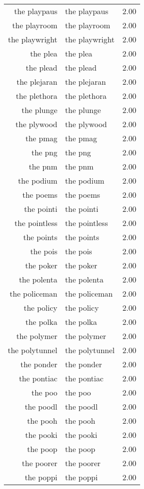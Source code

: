 \begin{table}[ht]
\begin{tabular}{rlr}
  the playpaus & the playpaus & 2.00 \\ 
  the playroom & the playroom & 2.00 \\ 
  the playwright & the playwright & 2.00 \\ 
  the plea & the plea & 2.00 \\ 
  the plead & the plead & 2.00 \\ 
  the plejaran & the plejaran & 2.00 \\ 
  the plethora & the plethora & 2.00 \\ 
  the plunge & the plunge & 2.00 \\ 
  the plywood & the plywood & 2.00 \\ 
  the pmag & the pmag & 2.00 \\ 
  the png & the png & 2.00 \\ 
  the pnm & the pnm & 2.00 \\ 
  the podium & the podium & 2.00 \\ 
  the poems & the poems & 2.00 \\ 
  the pointi & the pointi & 2.00 \\ 
  the pointless & the pointless & 2.00 \\ 
  the points & the points & 2.00 \\ 
  the pois & the pois & 2.00 \\ 
  the poker & the poker & 2.00 \\ 
  the polenta & the polenta & 2.00 \\ 
  the policeman & the policeman & 2.00 \\ 
  the policy & the policy & 2.00 \\ 
  the polka & the polka & 2.00 \\ 
  the polymer & the polymer & 2.00 \\ 
  the polytunnel & the polytunnel & 2.00 \\ 
  the ponder & the ponder & 2.00 \\ 
  the pontiac & the pontiac & 2.00 \\ 
  the poo & the poo & 2.00 \\ 
  the poodl & the poodl & 2.00 \\ 
  the pooh & the pooh & 2.00 \\ 
  the pooki & the pooki & 2.00 \\ 
  the poop & the poop & 2.00 \\ 
  the poorer & the poorer & 2.00 \\ 
  the poppi & the poppi & 2.00 \\ 

\end{tabular}
\end{table}
